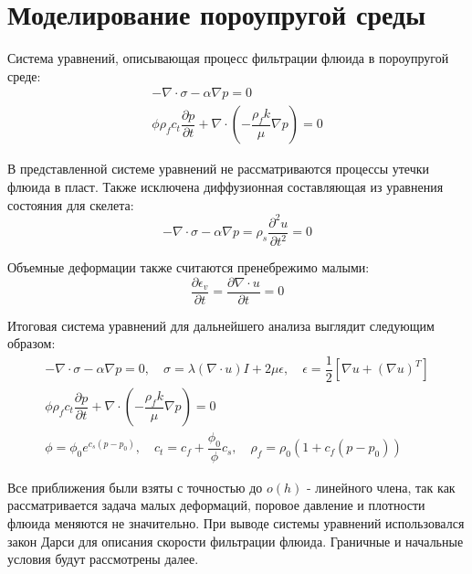 \section*{Моделирование пороупругой среды}

Система уравнений, описывающая процесс фильтрации флюида в пороупругой среде:
\begin{equation}
	\begin{multlined}
		- \nabla \cdot \sigma - \alpha \nabla p = 0 \\[10pt]
		\phi \rho_f c_t \dfrac{\partial p}{\partial t} + \nabla \cdot \left ( -\dfrac{\rho_f k}{\mu} \nabla p \right ) = 0
	\end{multlined}
\end{equation}

В представленной системе уравнений не рассматриваются процессы утечки флюида в пласт. Также исключена диффузионная составляющая из уравнения состояния для скелета:
\begin{equation*}
	- \nabla \cdot \sigma - \alpha \nabla p = \rho_s \dfrac{\partial^2 u}{\partial t^2} = 0
\end{equation*}

Объемные деформации также считаются пренебрежимо малыми:
\begin{equation*}
	\dfrac{\partial \epsilon_v}{\partial t} = \dfrac{\partial \nabla \cdot u}{\partial t} = 0
\end{equation*}

Итоговая система уравнений для дальнейшего анализа выглядит следующим образом:
\begin{equation}
	\label{eq:poroelasticity}
	\begin{multlined}
		- \nabla \cdot \sigma - \alpha \nabla p = 0, \quad \sigma = \lambda \left ( \nabla \cdot u \right ) I + 2 \mu \epsilon, \quad \epsilon = \dfrac{1}{2} \left [ \nabla u + \left ( \nabla u\right )^T \right ] \\[10pt]
		\phi \rho_f c_t \dfrac{\partial p}{\partial t} + \nabla \cdot \left ( -\dfrac{\rho_f k}{\mu} \nabla p \right ) = 0\\[10pt] \phi = \phi_0 e^{c_s \left ( p - p_0 \right )}, \quad c_t = c_f + \dfrac{\phi_0}{\phi} c_s, \quad \rho_f = \rho_0 \left ( 1 + c_f \left ( p - p_0  \right ) \right )
	\end{multlined}
\end{equation}

\newpage

Все приближения были взяты с точностью до $o(h)$ - линейного члена, так как рассматривается задача малых деформаций, поровое давление и плотности флюида меняются не значительно. При выводе системы уравнений использовался закон Дарси для описания скорости фильтрации флюида. Граничные и начальные условия будут рассмотрены далее.

